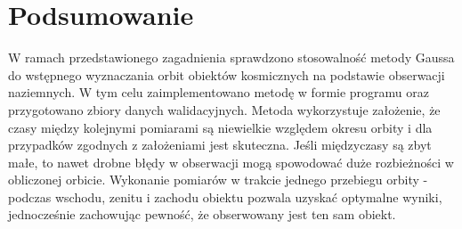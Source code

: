 \clearpage %
\section{Podsumowanie}

W ramach przedstawionego zagadnienia sprawdzono stosowalność metody Gaussa do wstępnego wyznaczania orbit obiektów kosmicznych na podstawie obserwacji naziemnych. W tym celu zaimplementowano metodę w formie programu oraz przygotowano zbiory danych walidacyjnych. Metoda wykorzystuje założenie, że czasy między kolejnymi pomiarami są niewielkie względem okresu orbity i dla przypadków zgodnych z założeniami jest skuteczna. Jeśli międzyczasy są zbyt małe, to nawet drobne błędy w obserwacji mogą spowodować duże rozbieżności w obliczonej orbicie. Wykonanie pomiarów w trakcie jednego przebiegu orbity - podczas wschodu, zenitu i zachodu obiektu pozwala uzyskać optymalne wyniki, jednocześnie zachowując pewność, że obserwowany jest ten sam obiekt.